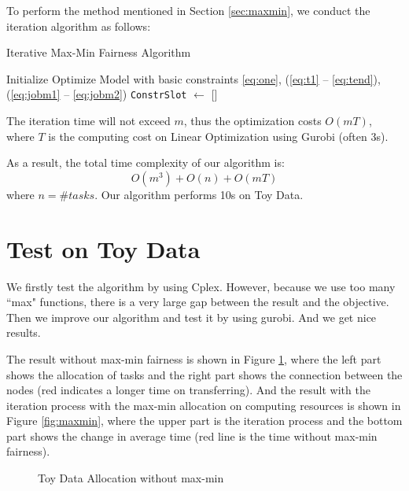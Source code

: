 \documentclass{llncs}
\begin{document}
To perform the method mentioned in Section \ref{sec:maxmin}, we conduct the iteration algorithm as follows:

\begin{algorithm}[h]
    \caption{Iterative Max-Min Fairness Algorithm}
    Initialize Optimize Model with basic constraints \eqref{eq:one}, (\ref{eq:t1} -- \ref{eq:tend}), (\ref{eq:jobm1} -- \ref{eq:jobm2})\;
    \texttt{ConstrSlot} $\leftarrow$ []\;
\end{algorithm}

The iteration time will not exceed $m$, thus the optimization costs $O(mT)$, where $T$ is the computing cost on Linear Optimization using Gurobi (often 3s).

As a result, the total time complexity of our algorithm is:
\begin{equation*}
    O(m^3)+O(n)+O(mT)
\end{equation*}
where $n=\#tasks$. Our algorithm performs 10s on Toy Data.

\section{Test on Toy Data}
We firstly test the algorithm by using Cplex. However, because we use too many ``max" functions, there is a very large gap between the result and the objective. Then we improve our algorithm and test it by using gurobi. And we get nice results.

The result without max-min fairness is shown in Figure \ref{fig:toydata}, where the left part shows the allocation of tasks and the right part shows the connection between the nodes (red indicates a longer time on transferring). And the result with the iteration process with the max-min allocation on computing resources is shown in Figure \ref{fig:maxmin}, where the upper part is the iteration process and the bottom part shows the change in average time (red line is the time without max-min fairness).

\begin{figure}[h]
    \centering
    
    \caption{Toy Data Allocation without max-min} %
    \label{fig:toydata}
\end{figure}
\end{document}
